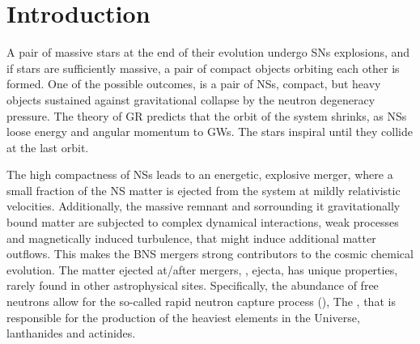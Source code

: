 \chapter{Introduction} \label{ch:intro}


A pair of massive stars at the end of their evolution undergo \acp{SN} explosions, and 
if stars are sufficiently massive, a pair of compact objects orbiting each other is formed. 
One of the possible outcomes, is a pair of \acp{NS}, compact, but heavy objects sustained 
against gravitational collapse by the neutron degeneracy pressure. 
The theory of \ac{GR} predicts that the orbit of the system shrinks, as \acp{NS} loose energy 
and angular momentum to \acp{GW}. The stars inspiral until they collide at the last orbit. 


The high compactness of \acp{NS} leads to an energetic, explosive merger, where a small 
fraction of the \ac{NS} matter is ejected from the system at mildly relativistic 
velocities. 
Additionally, the massive \pmerg{} remnant and sorrounding it gravitationally bound 
matter are subjected to complex dynamical interactions, weak processes and magnetically induced 
turbulence, that might induce additional matter outflows. This makes the \ac{BNS} mergers 
strong contributors to the cosmic chemical evolution. 
The matter ejected at/after mergers, \ie, ejecta, has unique properties, rarely found in other 
astrophysical sites. Specifically, the abundance of free neutrons allow for the so-called 
rapid neutron capture process (\rproc{}), 
The \rproc{}, that is responsible for the production of the heaviest elements in the 
Universe, lanthanides and actinides. 


